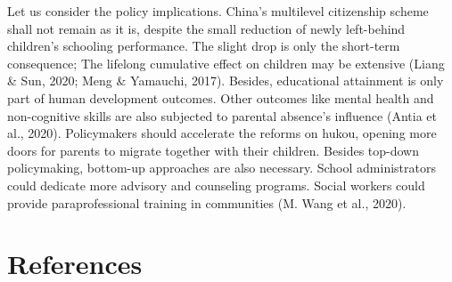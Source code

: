 \documentclass[
  man,floatsintext]{apa7}
\begin{document}
Let us consider the policy implications. China's multilevel citizenship scheme shall not remain as it is, despite the small reduction of newly left-behind children's schooling performance. The slight drop is only the short-term consequence; The lifelong cumulative effect on children may be extensive (Liang \& Sun, 2020; Meng \& Yamauchi, 2017). Besides, educational attainment is only part of human development outcomes. Other outcomes like mental health and non-cognitive skills are also subjected to parental absence's influence (Antia et al., 2020). Policymakers should accelerate the reforms on hukou, opening more doors for parents to migrate together with their children. Besides top-down policymaking, bottom-up approaches are also necessary. School administrators could dedicate more advisory and counseling programs. Social workers could provide paraprofessional training in communities (M. Wang et al., 2020).

\newpage

\hypertarget{references}{%
\section{References}\label{references}}
\end{document}
